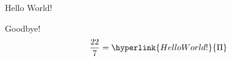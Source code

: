 \documentclass{beamer}
\begin{document}
\begin{frame}{Hello World!}
\hyperlink{Goodbye!}{}
\end{frame}

\begin{frame}{Goodbye!}
\begin{equation}
\dfrac{22}{7} = \hyperlink{Hello World!}{\Pi}
\end{equation}
\end{frame}
\end{document}
